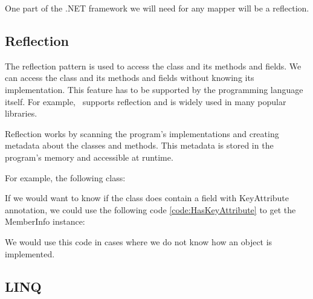 One part of the .NET framework we will need for any mapper will be a reflection.

\subsection{Reflection}

The reflection pattern is used to access the class and its methods and fields. We can access the class and its methods and fields without knowing its implementation.
This feature has to be supported by the programming language itself. For example, \CS\ supports reflection and is widely used in many popular libraries.

Reflection works by scanning the program's implementations and creating metadata about the classes and methods.
This metadata is stored in the program's memory and accessible at runtime.

For example, the following class:


If we would want to know if the class does contain a field with KeyAttribute annotation, we could use the following code \ref{code:HasKeyAttribute} to get the MemberInfo instance:


We would use this code in cases where we do not know how an object is implemented.

\subsection {LINQ}


